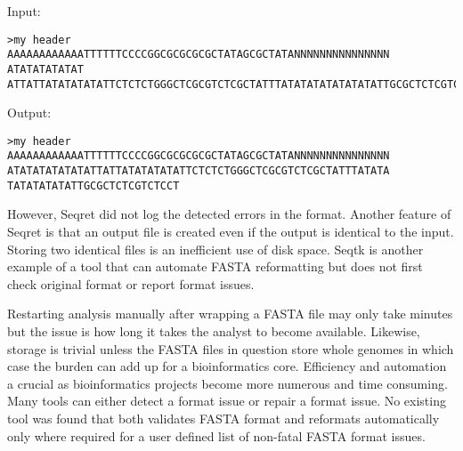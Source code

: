Input:

\begin{verbatim}
>my header
AAAAAAAAAAAATTTTTTCCCCGGCGCGCGCGCTATAGCGCTATANNNNNNNNNNNNNNN
ATATATATATAT
ATTATTATATATATATTCTCTCTGGGCTCGCGTCTCGCTATTTATATATATATATATATTGCGCTCTCGTCTCCT\end{verbatim}

Output:

\begin{verbatim}
>my header
AAAAAAAAAAAATTTTTTCCCCGGCGCGCGCGCTATAGCGCTATANNNNNNNNNNNNNNN
ATATATATATATATTATTATATATATATTCTCTCTGGGCTCGCGTCTCGCTATTTATATA
TATATATATATTGCGCTCTCGTCTCCT
\end{verbatim}

However, Seqret did not log the detected errors in the format. Another feature of Seqret is that an output file is created even if the output is identical to the input. Storing two identical files is an inefficient use of disk space. Seqtk \cite{Li2013} is another example of a tool that can automate FASTA reformatting but does not first check original format or report format issues. 

Restarting analysis manually after wrapping a FASTA file may only take minutes but the issue is how long it takes the analyst to become available. Likewise, storage is trivial unless the FASTA files in question store whole genomes in which case the burden can add up for a bioinformatics core. Efficiency and automation a crucial as bioinformatics projects become more numerous and time consuming. Many tools can either detect a format issue or repair a format issue. No existing tool was found that both validates FASTA format and reformats automatically only where required for a user defined list of non-fatal FASTA format issues.

  
  
  
  
  
  
  
  
  
  
  
  
  
  
  
  
  
  
  
  
  
  
  
  
  
  
  
  
  
  
  
  
  
